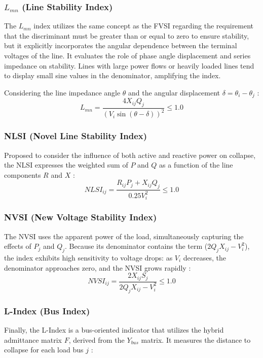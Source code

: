 \documentclass[conference]{IEEEtran}
\begin{document}
\subsubsection{$L_{mn}$ (Line Stability Index)}
The $L_{mn}$ index utilizes the same concept as the FVSI regarding the requirement that the discriminant must be greater than or equal to zero to ensure stability, but it explicitly incorporates the angular dependence between the terminal voltages of the line. It evaluates the role of phase angle displacement and series impedance on stability. Lines with large power flows or heavily loaded lines tend to display small sine values in the denominator, amplifying the index.

Considering the line impedance angle $\theta$ and the angular displacement $\delta = \theta_i - \theta_j$ \cite{moghavvemi98}:
\begin{equation}
L_{mn} = \frac{4 X_{ij} Q_j}{(V_i \sin(\theta - \delta))^2} \le 1.0
\end{equation}

\subsubsection{NLSI (Novel Line Stability Index)}
Proposed to consider the influence of both active and reactive power on collapse, the NLSI expresses the weighted sum of $P$ and $Q$ as a function of the line components $R$ and $X$ \cite{YazdanpanahGoharrizi2007}:
\begin{equation}
NLSI_{ij} = \frac{R_{ij} P_j + X_{ij} Q_j}{0.25 V_i^2} \le 1.0
\end{equation}

\subsubsection{NVSI (New Voltage Stability Index)}
The NVSI uses the apparent power of the load, simultaneously capturing the effects of $P_j$ and $Q_j$. Because its denominator contains the term ($2 Q_j X_{ij} - V_i^2$), the index exhibits high sensitivity to voltage drops: as $V_i$ decreases, the denominator approaches zero, and the NVSI grows rapidly \cite{kanimozhi2013novel}:
\begin{equation}
NVSI_{ij} = \frac{2 X_{ij} S_j}{2 Q_j X_{ij} - V_i^2} \le 1.0
\end{equation}

\subsubsection{L-Index (Bus Index)}
Finally, the L-Index is a bus-oriented indicator that utilizes the hybrid admittance matrix $F$, derived from the $Y_{bus}$ matrix. It measures the distance to collapse for each load bus $j$ \cite{kessel}:
\end{document}
